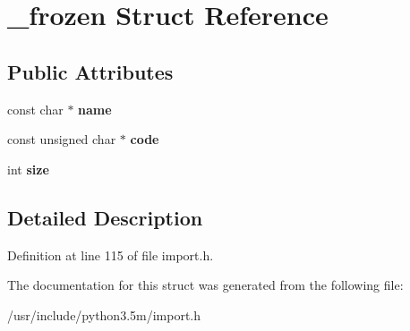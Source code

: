 \hypertarget{struct__frozen}{}\section{\+\_\+frozen Struct Reference}
\label{struct__frozen}
\subsection*{Public Attributes}
\begin{DoxyCompactItemize}
\item 
const char $\ast$ {\bfseries name}\hypertarget{struct__frozen_a8be742b72e76c58bf8b800094241d464}{}\label{struct__frozen_a8be742b72e76c58bf8b800094241d464}

\item 
const unsigned char $\ast$ {\bfseries code}\hypertarget{struct__frozen_abeec3d509d268a97be2f4ab4e4bf1b5c}{}\label{struct__frozen_abeec3d509d268a97be2f4ab4e4bf1b5c}

\item 
int {\bfseries size}\hypertarget{struct__frozen_a133542436cc02e1856dd2108c0dc1efc}{}\label{struct__frozen_a133542436cc02e1856dd2108c0dc1efc}

\end{DoxyCompactItemize}


\subsection{Detailed Description}


Definition at line 115 of file import.\+h.



The documentation for this struct was generated from the following file\+:\begin{DoxyCompactItemize}
\item 
/usr/include/python3.\+5m/import.\+h\end{DoxyCompactItemize}
